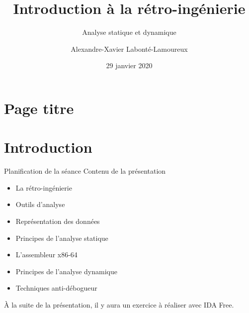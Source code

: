 \documentclass[10pt,xcolor={table,dvipsnames},t]{beamer}
\title[Intro à la rétro-ingénierie]{Introduction à la rétro-ingénierie}
\subtitle{Analyse statique et dynamique}
\author{Alexandre-Xavier Labonté-Lamoureux}
\institute{Délégation des compétitions en informatique de l'ÉTS}
\date{29 janvier 2020}
\begin{document}
\section{Page titre}

{

    \begin{frame}
        \titlepage
    \end{frame}
}


\section{Introduction}

\begin{frame}{Planification de la séance}
    Contenu de la présentation
    \begin{itemize}
        \item La rétro-ingénierie
        \item Outils d'analyse
        \item Représentation des données
        \item Principes de l'analyse statique
        \item L'assembleur x86-64
        \item Principes de l'analyse dynamique
        \item Techniques anti-débogueur
        \newline
    \end{itemize}
À la suite de la présentation, il y aura un exercice à réaliser avec IDA Free.


\end{frame}
\end{document}

